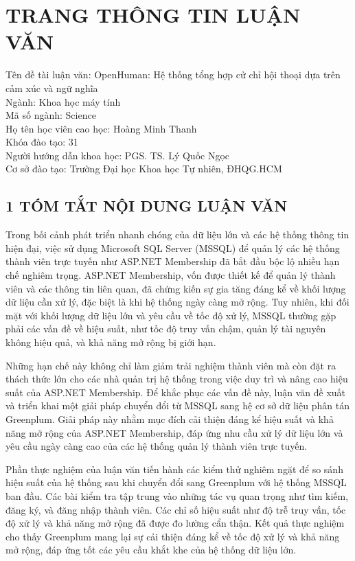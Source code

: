 
{}
\section*{\centering \MakeUppercase{TRANG THÔNG TIN LUẬN VĂN}}


Tên đề tài luận văn: OpenHuman: Hệ thống tổng hợp cử chỉ hội thoại dựa trên cảm xúc và ngữ nghĩa \\
Ngành: Khoa học máy tính \\
Mã số ngành:  Science \\
Họ tên học viên cao học: Hoàng Minh Thanh \\
Khóa đào tạo: 31 \\
Người hướng dẫn khoa học: PGS. TS. Lý Quốc Ngọc \\
Cơ sở đào tạo: Trường Đại học Khoa học Tự nhiên, ĐHQG.HCM


\subsection*{1 TÓM TẮT NỘI DUNG LUẬN VĂN}
Trong bối cảnh phát triển nhanh chóng của dữ liệu lớn và các hệ thống thông tin hiện đại, việc sử dụng Microsoft SQL Server (MSSQL) để quản lý các hệ thống thành viên trực tuyến như ASP.NET Membership đã bắt đầu bộc lộ nhiều hạn chế nghiêm trọng. ASP.NET Membership, vốn được thiết kế để quản lý thành viên và các thông tin liên quan, đã chứng kiến sự gia tăng đáng kể về khối lượng dữ liệu cần xử lý, đặc biệt là khi hệ thống ngày càng mở rộng. Tuy nhiên, khi đối mặt với khối lượng dữ liệu lớn và yêu cầu về tốc độ xử lý, MSSQL thường gặp phải các vấn đề về hiệu suất, như tốc độ truy vấn chậm, quản lý tài nguyên không hiệu quả, và khả năng mở rộng bị giới hạn.

Những hạn chế này không chỉ làm giảm trải nghiệm thành viên mà còn đặt ra thách thức lớn cho các nhà quản trị hệ thống trong việc duy trì và nâng cao hiệu suất của ASP.NET Membership. Để khắc phục các vấn đề này, luận văn đề xuất và triển khai một giải pháp chuyển đổi từ MSSQL sang hệ cơ sở dữ liệu phân tán Greenplum. Giải pháp này nhằm mục đích cải thiện đáng kể hiệu suất và khả năng mở rộng của ASP.NET Membership, đáp ứng nhu cầu xử lý dữ liệu lớn và yêu cầu ngày càng cao của các hệ thống quản lý thành viên trực tuyến.


Phần thực nghiệm của luận văn tiến hành các kiểm thử nghiêm ngặt để so sánh hiệu suất của hệ thống sau khi chuyển đổi sang Greenplum với hệ thống MSSQL ban đầu. Các bài kiểm tra tập trung vào những tác vụ quan trọng như tìm kiếm, đăng ký, và đăng nhập thành viên. Các chỉ số hiệu suất như độ trễ truy vấn, tốc độ xử lý và khả năng mở rộng đã được đo lường cẩn thận. Kết quả thực nghiệm cho thấy Greenplum mang lại sự cải thiện đáng kể về tốc độ xử lý và khả năng mở rộng, đáp ứng tốt các yêu cầu khắt khe của hệ thống dữ liệu lớn.

